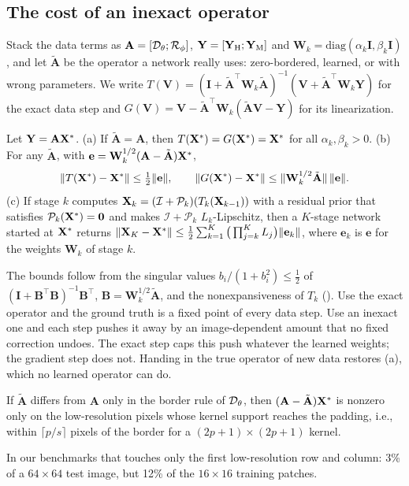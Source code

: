 \documentclass[10pt,twocolumn,letterpaper]{article}
\begin{document}
\subsection{The cost of an inexact operator}
\label{sec:mismatch}
Stack the data terms as $\mathbf{A}=[\mathcal{D}_\theta;\mathcal{R}_\phi]$, $\mathbf{Y}=[\mathbf{Y}_{\mathrm{H}};\mathbf{Y}_{\mathrm{M}}]$ and $\mathbf{W}_k=\mathrm{diag}(\alpha_k\mathbf{I},\beta_k\mathbf{I})$, and let $\tilde{\mathbf{A}}$ be the operator a network really uses: zero-bordered, learned, or with wrong parameters. We write $T(\mathbf{V})=(\mathbf{I}+\tilde{\mathbf{A}}^{\top}\mathbf{W}_k\tilde{\mathbf{A}})^{-1}(\mathbf{V}+\tilde{\mathbf{A}}^{\top}\mathbf{W}_k\mathbf{Y})$ for the exact data step and $G(\mathbf{V})=\mathbf{V}-\tilde{\mathbf{A}}^{\top}\mathbf{W}_k(\tilde{\mathbf{A}}\mathbf{V}-\mathbf{Y})$ for its linearization.
\begin{theorem}
\label{thm:mismatch}
Let $\mathbf{Y}=\mathbf{A}\mathbf{X}^*$. (a) If $\tilde{\mathbf{A}}=\mathbf{A}$, then $T(\mathbf{X}^*)=G(\mathbf{X}^*)=\mathbf{X}^*$ for all $\alpha_k,\beta_k>0$. (b) For any $\tilde{\mathbf{A}}$, with $\mathbf{e}=\mathbf{W}_k^{1/2}(\mathbf{A}-\tilde{\mathbf{A}})\mathbf{X}^*$,
\begin{equation}
\|T(\mathbf{X}^*)-\mathbf{X}^*\|\le\tfrac12\|\mathbf{e}\|,\qquad \|G(\mathbf{X}^*)-\mathbf{X}^*\|\le\|\mathbf{W}_k^{1/2}\tilde{\mathbf{A}}\|\,\|\mathbf{e}\|.
\label{eq:bound}
\end{equation}
(c) If stage $k$ computes $\mathbf{X}_k=(\mathcal{I}+\mathcal{P}_k)(T_k(\mathbf{X}_{k-1}))$ with a residual prior that satisfies $\mathcal{P}_k(\mathbf{X}^*)=\mathbf{0}$ and makes $\mathcal{I}+\mathcal{P}_k$ $L_k$-Lipschitz, then a $K$-stage network started at $\mathbf{X}^*$ returns $\|\mathbf{X}_K-\mathbf{X}^*\|\le\tfrac12\sum_{k=1}^{K}\big(\prod_{j=k}^{K}L_j\big)\|\mathbf{e}_k\|$, where $\mathbf{e}_k$ is $\mathbf{e}$ for the weights $\mathbf{W}_k$ of stage $k$.
\end{theorem}
The bounds follow from the singular values $b_i/(1+b_i^2)\le\tfrac12$ of $(\mathbf{I}+\mathbf{B}^{\top}\mathbf{B})^{-1}\mathbf{B}^{\top}$, $\mathbf{B}=\mathbf{W}_k^{1/2}\tilde{\mathbf{A}}$, and the nonexpansiveness of $T_k$ (\supp). Use the exact operator and the ground truth is a fixed point of every data step. Use an inexact one and each step pushes it away by an image-dependent amount that no fixed correction undoes. The exact step caps this push whatever the learned weights; the gradient step does not. Handing in the true operator of new data restores (a), which no learned operator can do.
\begin{corollary}
\label{cor:border}
If $\tilde{\mathbf{A}}$ differs from $\mathbf{A}$ only in the border rule of $\mathcal{D}_\theta$, then $(\mathbf{A}-\tilde{\mathbf{A}})\mathbf{X}^*$ is nonzero only on the low-resolution pixels whose kernel support reaches the padding, i.e., within $\lceil p/s\rceil$ pixels of the border for a $(2p+1)\times(2p+1)$ kernel.
\end{corollary}
In our benchmarks that touches only the first low-resolution row and column: 3\% of a $64\times64$ test image, but 12\% of the $16\times16$ training patches.
\end{document}
